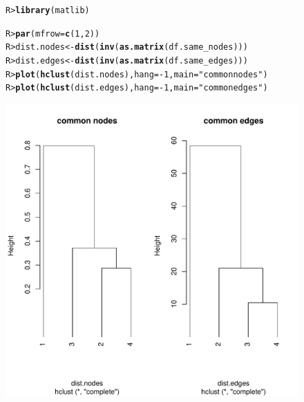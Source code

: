 \documentclass[article]{jss}\usepackage[]{graphicx}\usepackage[]{color}
\makeatletter
\def\maxwidth{ %
  \ifdim\Gin@nat@width>\linewidth
    \linewidth
  \else
    \Gin@nat@width
  \fi
}
\newcommand{\hlnum}[1]{\textcolor[rgb]{0.686,0.059,0.569}{#1}}%
\newcommand{\hlstr}[1]{\textcolor[rgb]{0.192,0.494,0.8}{#1}}%
\newcommand{\hlopt}[1]{\textcolor[rgb]{0,0,0}{#1}}%
\newcommand{\hlstd}[1]{\textcolor[rgb]{0.345,0.345,0.345}{#1}}%
\newcommand{\hlkwb}[1]{\textcolor[rgb]{0.69,0.353,0.396}{#1}}%
\newcommand{\hlkwc}[1]{\textcolor[rgb]{0.333,0.667,0.333}{#1}}%
\newcommand{\hlkwd}[1]{\textcolor[rgb]{0.737,0.353,0.396}{\textbf{#1}}}%
\newenvironment{kframe}{%
 \def\at@end@of@kframe{}%
 \ifinner\ifhmode%
  \def\at@end@of@kframe{\end{minipage}}%
  \begin{minipage}{\columnwidth}%
 \fi\fi%
 \def\FrameCommand##1{\hskip\@totalleftmargin \hskip-\fboxsep
 \colorbox{shadecolor}{##1}\hskip-\fboxsep
     \hskip-\linewidth \hskip-\@totalleftmargin \hskip\columnwidth}%
 \MakeFramed {\advance\hsize-\width
   \@totalleftmargin\z@ \linewidth\hsize
   \@setminipage}}%
 {\par\unskip\endMakeFramed%
 \at@end@of@kframe}
\newenvironment{knitrout}{}{} %
\makeatother
\begin{document}
\begin{figure}[H]
\begin{knitrout}
\color{fgcolor}\begin{kframe}
\begin{alltt}
\hlstd{R> }\hlkwd{library}\hlstd{(matlib)}
\end{alltt}


{\ttfamily\noindent\color{warningcolor}{\#\# Warning: package 'matlib' was built under R version 3.6.3}}\begin{alltt}
\hlstd{R> }\hlkwd{par}\hlstd{(}\hlkwc{mfrow}\hlstd{=}\hlkwd{c}\hlstd{(}\hlnum{1}\hlstd{,}\hlnum{2}\hlstd{))}
\hlstd{R> }\hlstd{dist.nodes}  \hlkwb{<-} \hlkwd{dist}\hlstd{(}\hlkwd{inv}\hlstd{(}\hlkwd{as.matrix}\hlstd{(df.same_nodes)))}
\hlstd{R> }\hlstd{dist.edges}  \hlkwb{<-} \hlkwd{dist}\hlstd{(}\hlkwd{inv}\hlstd{(}\hlkwd{as.matrix}\hlstd{(df.same_edges)))}
\hlstd{R> }\hlkwd{plot}\hlstd{(}\hlkwd{hclust}\hlstd{(dist.nodes),} \hlkwc{hang} \hlstd{=} \hlopt{-}\hlnum{1}\hlstd{,} \hlkwc{main} \hlstd{=} \hlstr{"common nodes"}\hlstd{)}
\hlstd{R> }\hlkwd{plot}\hlstd{(}\hlkwd{hclust}\hlstd{(dist.edges),} \hlkwc{hang} \hlstd{=} \hlopt{-}\hlnum{1}\hlstd{,} \hlkwc{main} \hlstd{=} \hlstr{"common edges"}\hlstd{)}
\end{alltt}
\end{kframe}
\includegraphics[width=\maxwidth]{figure/unnamed-chunk-15-1} 

\end{knitrout}
\end{figure}
\end{document}
